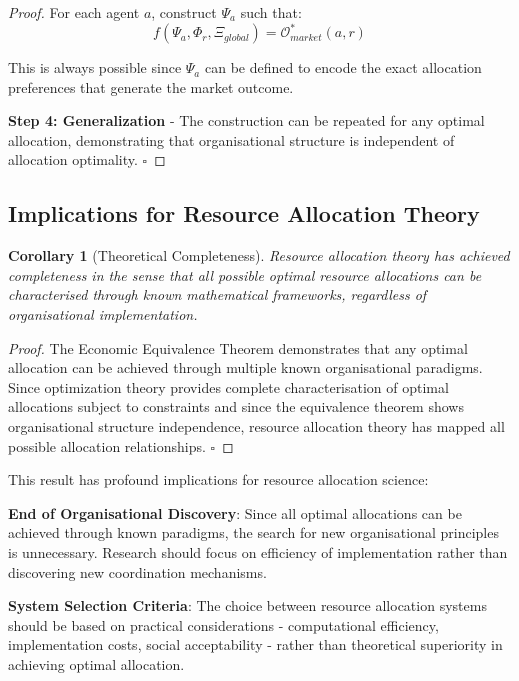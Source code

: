\documentclass[12pt,a4paper]{article}
\newtheorem{corollary}[theorem]{Corollary}
\begin{document}
\begin{proof}
For each agent $a$, construct $\Psi_a$ such that:
\begin{equation}
f(\Psi_a, \Phi_r, \Xi_{global}) = \mathcal{O}^*_{market}(a,r)
\end{equation}

This is always possible since $\Psi_a$ can be defined to encode the exact allocation preferences that generate the market outcome.

\textbf{Step 4: Generalization} - The construction can be repeated for any optimal allocation, demonstrating that organisational structure is independent of allocation optimality. $\square$
\end{proof}

\subsection{Implications for Resource Allocation Theory}

\begin{corollary}[Theoretical Completeness]
Resource allocation theory has achieved completeness in the sense that all possible optimal resource allocations can be characterised through known mathematical frameworks, regardless of organisational implementation.
\end{corollary}


\begin{proof}
The Economic Equivalence Theorem demonstrates that any optimal allocation can be achieved through multiple known organisational paradigms. Since optimization theory provides complete characterisation of optimal allocations subject to constraints and since the equivalence theorem shows organisational structure independence, resource allocation theory has mapped all possible allocation relationships. $\square$
\end{proof}

This result has profound implications for resource allocation science:

\textbf{End of Organisational Discovery}: Since all optimal allocations can be achieved through known paradigms, the search for new organisational principles is unnecessary. Research should focus on efficiency of implementation rather than discovering new coordination mechanisms.

\textbf{System Selection Criteria}: The choice between resource allocation systems should be based on practical considerations - computational efficiency, implementation costs, social acceptability - rather than theoretical superiority in achieving optimal allocation.
\end{document}
